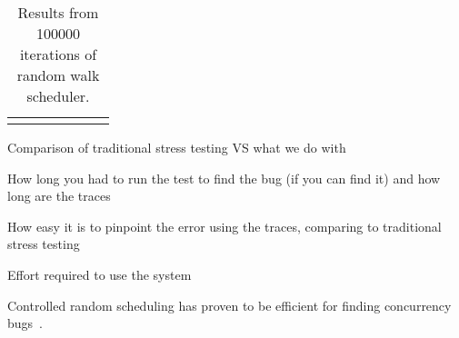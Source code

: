 \setlength{\tabcolsep}{.42em}
\begin{table*}[t]
\small
\centering
\begin{tabular}{l rr rrrr}
\centering

\end{tabular}
\caption{Results from 100000 iterations of \psharp random walk scheduler.}
\label{tab:testing}
\end{table*}

Comparison of traditional stress testing VS what we do with \psharp

How long you had to run the test to find the bug (if you can find it) and how long are the traces

How easy it is to pinpoint the error using the \psharp traces, comparing to traditional stress testing

Effort required to use the system

Controlled random scheduling has proven to be efficient for finding concurrency bugs~\cite{thomson2014sct, deligiannis2015psharp}.
